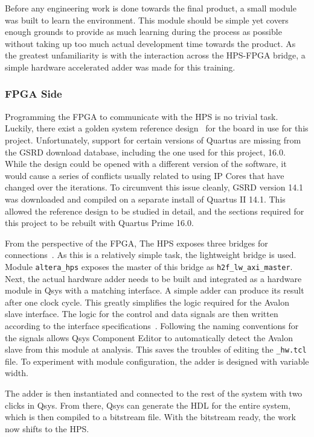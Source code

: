 Before any engineering work is done towards the final product, a small module
was built to learn the environment.
This module should be simple yet covers enough grounds to provide as much
learning during the process as possible without taking up too much actual
development time towards the product.
As the greatest unfamiliarity is with the interaction across the HPS-FPGA
bridge, a simple hardware accelerated adder was made for this training.

\subsubsection{\textbf{FPGA Side}}
Programming the FPGA to communicate with the HPS is no trivial task.
Luckily, there exist a golden system reference design~\cite{Rocket1} for
the board in use for this project.
Unfortunately, support for certain versions of Quartus are missing from
the GSRD download database, including the one used for this project, 16.0.
While the design could be opened with a different version of the software,
it would cause a series of conflicts usually related to using IP Cores that
have changed over the iterations.
To circumvent this issue cleanly, GSRD version 14.1 was downloaded and compiled
on a separate install of Quartus II 14.1.
This allowed the reference design to be studied in detail, and the sections
required for this project to be rebuilt with Quartus Prime 16.0.

From the perspective of the FPGA, The HPS exposes three bridges for
connections~\cite{Altera6}.
As this is a relatively simple task, the lightweight bridge is used.
Module \texttt{altera\_hps} exposes the master of this bridge as
\texttt{h2f\_lw\_axi\_master}.
Next, the actual hardware adder needs to be built and integrated as a hardware
module in Qsys with a matching interface.
A simple adder can produce its result after one clock cycle.
This greatly simplifies the logic required for the Avalon slave interface.
The logic for the control and data signals are then written according to the
interface specifications~\cite{Intel3}.
Following the naming conventions for the signals allows Qsys Component Editor
to automatically detect the Avalon slave from this module at analysis.
This saves the troubles of editing the \texttt{\_hw.tcl} file.
To experiment with module configuration, the adder is designed with variable
width.

The adder is then instantiated and connected to the rest of the system with
two clicks in Qsys.
From there, Qsys can generate the HDL for the entire system, which is then
compiled to a bitstream file.
With the bitstream ready, the work now shifts to the HPS.

